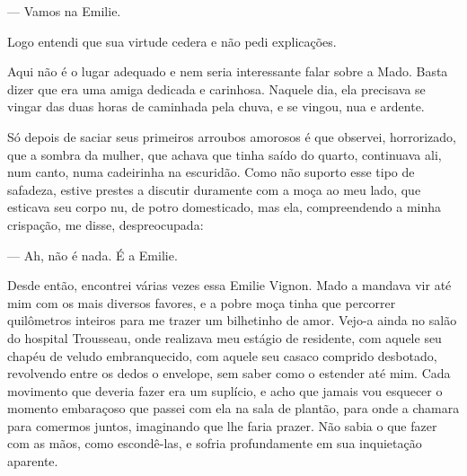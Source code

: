 --- Vamos na Emilie.

Logo entendi que sua virtude cedera e não pedi explicações.


Aqui não é o lugar adequado e nem seria interessante falar sobre a Mado.
Basta dizer que era uma amiga dedicada e carinhosa. Naquele dia, ela
precisava se vingar das duas horas de caminhada pela chuva, e se vingou,
nua e ardente.

Só depois de saciar seus primeiros arroubos amorosos é que observei,
horrorizado, que a sombra da mulher, que achava que tinha saído do
quarto, continuava ali, num canto, numa cadeirinha na escuridão. Como
não suporto esse tipo de safadeza, estive prestes a discutir duramente
com a moça ao meu lado, que esticava seu corpo nu, de potro domesticado,
mas ela, compreendendo a minha crispação, me disse, despreocupada:

--- Ah, não é nada. É a Emilie.


Desde então, encontrei várias vezes essa Emilie Vignon. Mado a mandava
vir até mim com os mais diversos favores, e a pobre moça tinha que
percorrer quilômetros inteiros para me trazer um bilhetinho de amor.
Vejo-a ainda no salão do hospital Trousseau, onde realizava meu estágio
de residente, com aquele seu chapéu de veludo embranquecido, com aquele
seu casaco comprido desbotado, revolvendo entre os dedos o envelope, sem
saber como o estender até mim. Cada movimento que deveria fazer era um
suplício, e acho que jamais vou esquecer o momento embaraçoso que passei
com ela na sala de plantão, para onde a chamara para comermos juntos,
imaginando que lhe faria prazer. Não sabia o que fazer com as mãos, como
escondê-las, e sofria profundamente em sua inquietação aparente.

